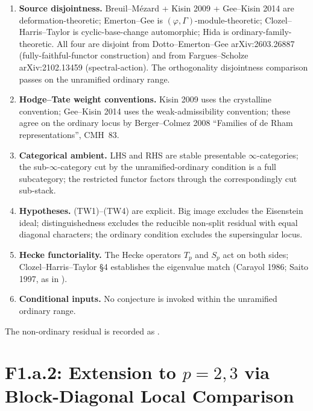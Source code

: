 \begin{enumerate}
\item \textbf{Source disjointness.} Breuil--M{\'e}zard +
Kisin 2009 + Gee--Kisin 2014 are deformation-theoretic; Emerton--Gee
is \((\varphi,\Gamma)\)-module-theoretic; Clozel--Harris--Taylor is
cyclic-base-change automorphic; Hida is ordinary-family-theoretic.
All four are disjoint from Dotto--Emerton--Gee arXiv:2603.26887
(fully-faithful-functor construction) and from
Fargues--Scholze arXiv:2102.13459 (spectral-action). The orthogonality
disjointness comparison passes on the unramified ordinary range.

\item \textbf{Hodge--Tate weight conventions.}
Kisin 2009 uses the crystalline convention; Gee--Kisin 2014 uses
the weak-admissibility convention; these agree on the ordinary
locus by Berger--Colmez 2008 ``Families of de Rham
representations'', CMH~83.

\item \textbf{Categorical ambient.} LHS and RHS are stable
presentable \(\infty\)-categories; the sub-\(\infty\)-category cut by
the unramified-ordinary condition is a full subcategory; the
restricted functor factors through the correspondingly cut
sub-stack.

\item \textbf{Hypotheses.} (TW1)--(TW4) are
explicit. Big image excludes the Eisenstein ideal; distinguishedness
excludes the reducible non-split residual with equal diagonal
characters; the ordinary condition excludes the supersingular locus.

\item \textbf{Hecke functoriality.} The Hecke operators
\(T_{p}\) and \(S_{p}\) act on both sides; Clozel--Harris--Taylor
\S 4 establishes the eigenvalue match (Carayol 1986; Saito 1997,
as in ).

\item \textbf{Conditional inputs.} No conjecture is invoked
within the unramified ordinary range.
\end{enumerate}

The non-ordinary residual is recorded as
.

\section{F1.a.2: Extension to \(p=2,3\) via Block-Diagonal Local Comparison}
\label{v4-arith:w5-e:f1a2}

